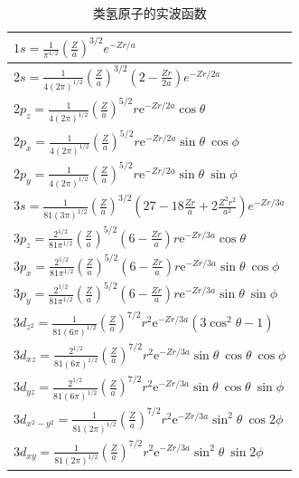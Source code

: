     \begin{table}[htbp]
        \centering
        \caption{类氢原子的实波函数}
        \label{tab:6.2}
        \renewcommand{\arraystretch}{1.5}
        \begin{tabular}{l}
            \hline
            $1s = \frac{1}{\pi^{1/2}}\left(\frac{Z}{a}\right)^{3/2}e^{-Zr/a}$ \\[0.5ex]
            \hline
            $2s = \frac{1}{4\left(2\pi\right)^{1/2}}\left(\frac{Z}{a}\right)^{3/2}\left(2 - \frac{Zr}{2a}\right)e^{-Zr/2a}$ \\[0.5ex]
            \hline
            $2p_z = \frac{1}{4\left(2\pi\right)^{1/2}}\left(\frac{Z}{a}\right)^{5/2}r\mathrm{e}^{-Zr/2a}\cos\theta$ \\[0.5ex]
            \hline
            $2p_x = \frac{1}{4\left(2\pi\right)^{1/2}}\left(\frac{Z}{a}\right)^{5/2}r\mathrm{e}^{-Zr/2a}\sin\theta\:\cos\phi$ \\[0.5ex]
            \hline
            $2p_y = \frac{1}{4\left(2\pi\right)^{1/2}}\left(\frac{Z}{a}\right)^{5/2}r\mathrm{e}^{-Zr/2a}\sin\theta\:\sin\phi$ \\[0.5ex]
            \hline
            $3s = \frac{1}{81\left(3\pi\right)^{1/2}}\left(\frac{Z}{a}\right)^{3/2}\left(27 - 18\frac{Zr}{a} + 2\frac{Z^2r^2}{a^2}\right)e^{-Zr/3a}$ \\[0.5ex]
            \hline
            $3p_z = \frac{2^{1/2}}{81\pi^{1/2}}\left(\frac{Z}{a}\right)^{5/2}\left(6 - \frac{Zr}{a}\right)r\mathrm{e}^{-Zr/3a}\cos\theta$ \\[0.5ex]
            \hline
            $3p_x = \frac{2^{1/2}}{81\pi^{1/2}}\left(\frac{Z}{a}\right)^{5/2}\left(6 - \frac{Zr}{a}\right)r\mathrm{e}^{-Zr/3a}\sin\theta\:\cos\phi$ \\[0.5ex]
            \hline
            $3p_y = \frac{2^{1/2}}{81\pi^{1/2}}\left(\frac{Z}{a}\right)^{5/2}\left(6 - \frac{Zr}{a}\right)r\mathrm{e}^{-Zr/3a}\sin\theta\:\sin\phi$ \\[0.5ex]
            \hline
            $3d_{z^2} = \frac{1}{81\left(6\pi\right)^{1/2}}\left(\frac{Z}{a}\right)^{7/2}r^2\mathrm{e}^{-Zr/3a}\left(3\cos^2\theta - 1\right)$ \\[0.5ex]
            \hline
            $3d_{xz} = \frac{2^{1/2}}{81\left(6\pi\right)^{1/2}}\left(\frac{Z}{a}\right)^{7/2}r^2\mathrm{e}^{-Zr/3a}\sin\theta\:\cos\theta\:\cos\phi$ \\[0.5ex]
            \hline
            $3d_{yz} = \frac{2^{1/2}}{81\left(6\pi\right)^{1/2}}\left(\frac{Z}{a}\right)^{7/2}r^2\mathrm{e}^{-Zr/3a}\sin\theta\:\cos\theta\:\sin\phi$ \\[0.5ex]
            \hline
            $3d_{x^2-y^2} = \frac{1}{81\left(2\pi\right)^{1/2}}\left(\frac{Z}{a}\right)^{7/2}r^2\mathrm{e}^{-Zr/3a}\sin^2\theta\:\cos2\phi$ \\[0.5ex]
            \hline
            $3d_{xy} = \frac{1}{81\left(2\pi\right)^{1/2}}\left(\frac{Z}{a}\right)^{7/2}r^2\mathrm{e}^{-Zr/3a}\sin^2\theta\:\sin2\phi$ \\[0.5ex]
        \end{tabular}
    \end{table}


